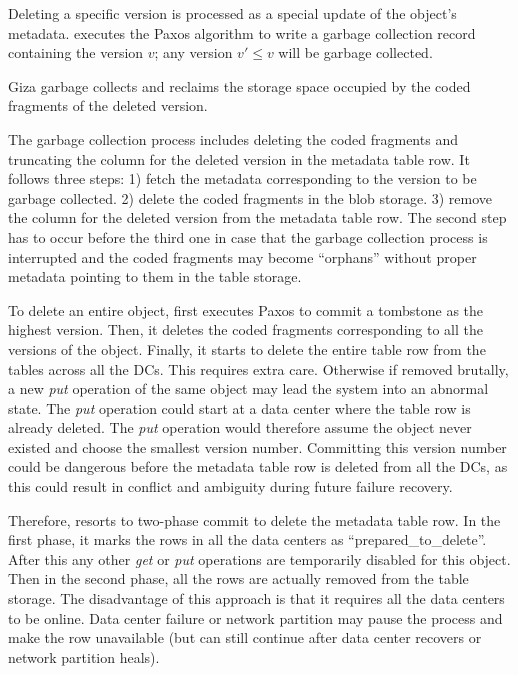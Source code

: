 Deleting a specific version is processed as a special update of the object's metadata.
\name executes the Paxos algorithm to write a garbage collection record containing
the version $v$; any version $v'\leq v$ will be garbage collected.  

Giza garbage collects and reclaims the storage space occupied by the coded fragments of the deleted version.

The garbage collection process includes deleting the coded fragments and
truncating the column for the deleted version in the metadata table row.
It follows three steps:
1) fetch the metadata corresponding to the version to be garbage collected.
2) delete the coded fragments in the blob storage.
3) remove the column for the deleted version from the metadata table row.
The second step has to occur before the third one in case that
the garbage collection process is interrupted and the coded fragments may become ``orphans''
without proper metadata pointing to them in the table storage.

To delete an entire object, 
{\name} first executes Paxos to commit a tombstone as the highest version.
Then, it deletes the coded fragments corresponding to all the versions of the object.
Finally, it starts to delete the entire table row from the tables across all the DCs.
This requires extra care. Otherwise if removed brutally, 
a new {\em put} operation of the same object may lead the system into an abnormal state.
The {\em put} operation could start at a data center where the table row is already deleted.
The {\em put} operation would therefore assume the object never existed and choose the smallest version number.
Committing this version number could be dangerous before the metadata table row is deleted from all the DCs,
as this could result in conflict and ambiguity during future failure recovery.

Therefore, {\name} resorts to two-phase commit to delete the metadata table row.
In the first phase, it marks the rows in all the data centers as ``prepared\_to\_delete''.
After this any other {\em get} or {\em put} operations are temporarily disabled for this object.
Then in the second phase, all the rows are actually removed from the table storage.
The disadvantage of this approach is that it requires all the data centers to be online.
Data center failure or network partition may pause the process and make the row unavailable
(but can still continue after data center recovers or network partition heals). 



